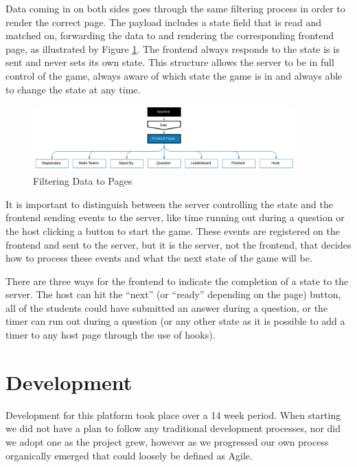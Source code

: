 \documentclass{article}
\begin{document}
            Data coming in on both sides goes through the same filtering process in order to render the correct page. The payload includes a state field that is read and matched on, forwarding the data to and rendering the corresponding frontend page, as illustrated by Figure \ref{fig:frontend-pages}. The frontend always responds to the state is is sent and never sets its own state. This structure allows the server to be in full control of the game, always aware of which state the game is in and always able to change the state at any time.

            \begin{figure}[ht]
                \centering
                \includegraphics[width=0.9\textwidth]{images/frontend-pages.png}
                \caption{Filtering Data to Pages}
                \label{fig:frontend-pages}
            \end{figure}
            
            It is important to distinguish between the server controlling the state and the frontend sending events to the server, like time running out during a question or the host clicking a button to start the game. These events are registered on the frontend and sent to the server, but it is the server, not the frontend, that decides how to process these events and what the next state of the game will be.
            
            \smallskip
            There are three ways for the frontend to indicate the completion of a state to the server. The host can hit the ``next'' (or ``ready'' depending on the page) button, all of the students could have submitted an answer during a question, or the timer can run out during a question (or any other state as it is possible to add a timer to any host page through the use of hooks).

\section{Development}
    Development for this platform took place over a 14 week period. When starting we did not have a plan to follow any traditional development processes, nor did we adopt one as the project grew, however as we progressed our own process organically emerged that could loosely be defined as Agile.
    \smallskip
    
\end{document}
